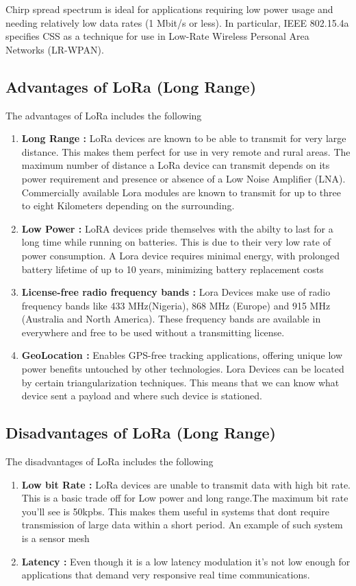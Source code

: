 Chirp spread spectrum is ideal for applications requiring low power usage and needing relatively low data rates (1 Mbit/s or less). In particular, IEEE 802.15.4a specifies CSS as a technique for use in Low-Rate Wireless Personal Area Networks (LR-WPAN).

\subsection{Advantages of LoRa (Long Range)}
The advantages of LoRa includes the following
\begin{enumerate}
\item \textbf{Long Range :} LoRa devices are known to be able to transmit for very large distance. This makes them perfect for use in very remote and rural areas. The maximum number of distance a LoRa device can transmit depends on its power requirement and presence or absence of a Low Noise Amplifier (LNA). Commercially available Lora modules are known to transmit for up to three to eight Kilometers depending on the surrounding. 
\item \textbf{Low Power :} LoRA devices pride themselves with the abilty to last for a long time while running on batteries. This is due to their very low rate of power consumption. A Lora device requires minimal energy, with prolonged battery lifetime of up to 10 years, minimizing battery replacement costs
\item \textbf{License-free radio frequency bands :}  Lora Devices make use of radio frequency bands like 433 MHz(Nigeria), 868 MHz (Europe) and 915 MHz (Australia and North America). These frequency bands are available in everywhere and free to be used without a transmitting license. 
\item \textbf{GeoLocation :}  Enables GPS-free tracking applications, offering unique low power benefits untouched by other technologies. Lora Devices can be located by certain triangularization techniques. This means that we can know what device sent a payload and where such device is stationed. 
\end{enumerate}

\subsection{Disadvantages of LoRa (Long Range)}
The disadvantages of LoRa includes the following
\begin{enumerate}
\item \textbf{Low bit Rate :} LoRa devices are unable to transmit data with high bit rate. This is a basic trade off for Low power and long range.The maximum bit rate you’ll see is 50kpbs. This makes them useful in systems that dont require transmission of large data within a short period. An example of such system is a sensor mesh 
\item \textbf{Latency  :} Even though it is a low latency modulation it’s not low enough for applications that demand very responsive real time communications.
\end{enumerate}



